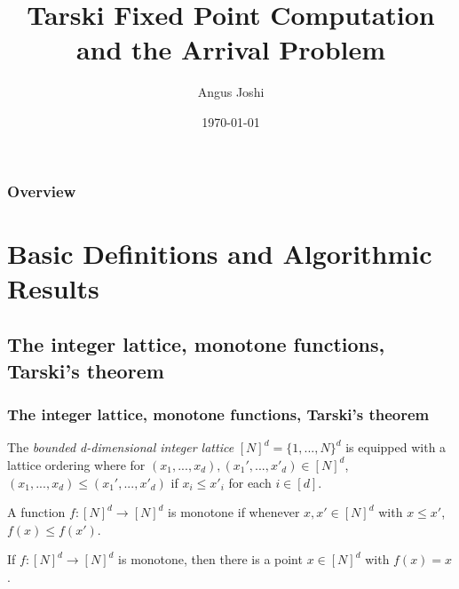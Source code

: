 \documentclass{beamer}
\title[Tarski]{Tarski Fixed Point Computation and the Arrival Problem} %
\author{Angus Joshi} %
\institute[UoE] %
{
University of Edinburgh \\ %
\medskip
\textit{s1712180@ed.ac.uk} %
}
\date{\today} %
\begin{document}
\begin{frame}
\titlepage %
\end{frame}

\begin{frame}
\frametitle{Overview} %
\tableofcontents %
\end{frame}


\section{Basic Definitions and Algorithmic Results} %

\subsection{The integer lattice, monotone functions, Tarski's theorem} %

\begin{frame}
\frametitle{The integer lattice, monotone functions, Tarski's theorem}
    \begin{definition}
        The \emph{bounded d-dimensional integer lattice} $[N]^d = \{1, ..., N\}^d$ is equipped with a lattice ordering
        where for $(x_1, ..., x_d), (x_1', ..., x'_d) \in [N]^d$, $(x_1, ..., x_d) \leq (x_1', ..., x'_d)$ if
        $x_i \leq x'_i$ for each $i \in [d]$.
    \end{definition}
    \begin{definition} 
        A function $f : [N]^d \to [N]^d$ is monotone if whenever $x, x' \in [N]^d$ with $x \leq x'$, $f(x) \leq f(x')$.
    \end{definition}
    \begin{Theorem}[Tarski, '55]
        If $f : [N]^d \to [N]^d$ is monotone, then there is a point $x \in [N]^d$ with $f(x) = x$.
    \end{Theorem}
\end{frame}
\end{document}
